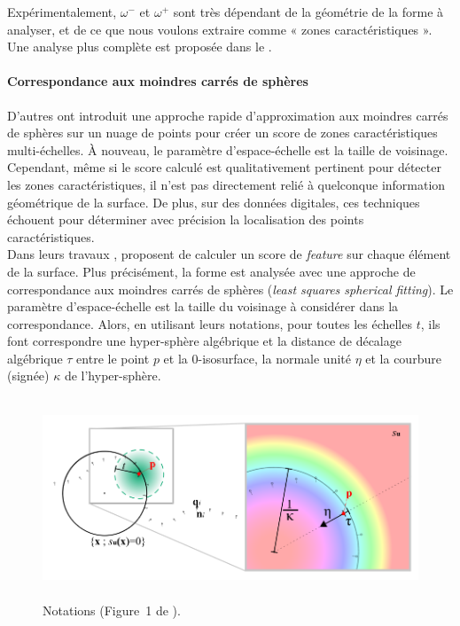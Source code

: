 %
Expérimentalement, $\omega^-$ et $\omega^+$ sont très dépendant de la géométrie
de la forme à analyser, et de ce que nous voulons extraire comme « zones
caractéristiques ». Une analyse plus complète est proposée dans le
.
%
\paragraph{Correspondance aux moindres carrés de sphères}%
\label{sec:applications:feature:growing}
%
D'autres \cite{Mellado2012} ont introduit une approche rapide d'approximation
aux moindres carrés de sphères sur un nuage de points pour créer un score de
zones caractéristiques multi-échelles. À nouveau, le paramètre d'espace-échelle
est la taille de voisinage. Cependant, même si le score calculé est
qualitativement pertinent pour détecter les zones caractéristiques, il n'est pas
directement relié à quelconque information géométrique de la surface. De plus,
sur des données digitales, ces techniques échouent pour déterminer avec
précision la localisation des points caractéristiques.
%
\\
%
Dans leurs travaux \cite{Mellado2012},  proposent de calculer
un score de \emph{feature} sur chaque élément de la surface. Plus précisément,
la forme est analysée avec une approche de correspondance aux moindres carrés de
sphères (\emph{least squares spherical fitting}). Le paramètre d'espace-échelle
est la taille du voisinage à considérer dans la correspondance. Alors, en
utilisant leurs notations, pour toutes les échelles $t$, ils font correspondre
une hyper-sphère algébrique et la distance de décalage algébrique $\tau$ entre
le point $p$ et la $0$-isosurface, la normale unité $\eta$ et la courbure
(signée) $\kappa$ de l'hyper-sphère.
%
\begin{figure}[ht]{
    \begin{center}
    \includegraphics[height=6cm]{images/Feature/Mellado_notations}
    \end{center}}
    \caption[Notations.]{Notations (Figure~1 de \cite{Mellado2012}).
      \label{fig:mellado-notations}}
\end{figure}
